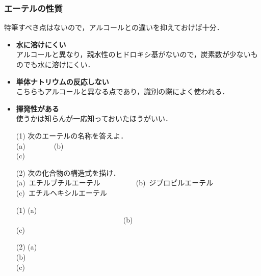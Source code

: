 \documentclass[a4paper,12pt]{ltjsreport}
\begin{document}
\subsubsection*{エーテルの性質}
特筆すべき点はないので，アルコールとの違いを抑えておけば十分．
\begin{itemize}
    \item \textbf{水に溶けにくい}\\
    アルコールと異なり，親水性のヒドロキシ基がないので，炭素数が少ないものでも水に溶けにくい．
    \item \textbf{単体ナトリウムの反応しない}\\
    こちらもアルコールと異なる点であり，識別の際によく使われる．
        \item \textbf{揮発性がある}\\
    使うかは知らんが一応知っておいたほうがいい．
\end{itemize}
\newpage
        \begin{que}
        \begin{itemize}
            \item [(1)]次のエーテルの名称を答えよ．\\
            
            \noindent(a)~~~~~~~~(b)~\\[5pt]
            (c)~\\
            \item [(2)]次の化合物の構造式を描け．\\
            (a)~エチルブチルエーテル~~~~~~~~~~(b)~ジプロピルエーテル~~\\
            (c)~エチルヘキシルエーテル
        \end{itemize}
        \end{que}
        \ans
        \begin{itemize}
            \item [(1)](a)~　　　　　　　~~~~~~~~~~~~~~~~~~~~~~~~~~~~~~(b)~~~~~~~~~~~~~~~~~\\[15pt]
            (c)\\[10pt]
            \item[(2)](a)\\[70pt]
            (b)\\[70pt]

            (c)
        \end{itemize}
\end{document}
